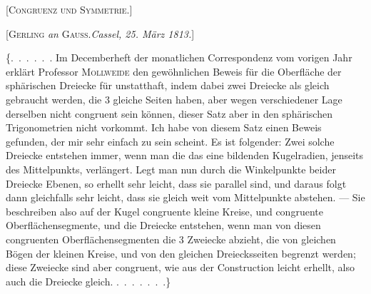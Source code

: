 \clearpage
{}%
\begin{center}
{\Large[\textsc{Congruenz und Symmetrie.}]}
\end{center}

\par\bigskip

\begin{center}
[\textsc{Gerling} \emph{an} \textsc{Gauss}.\quad \emph{Cassel, 25. März 1813.}]
\end{center}

\{\mbox{.\ .\ .\ .\ .\ .} Im Decemberheft der monatlichen Correspondenz vom vorigen Jahr
erklärt Professor \textsc{Mollweide} den gewöhnlichen Beweis für die
Oberfläche der sphärischen Dreiecke für unstatthaft, indem dabei zwei
Dreiecke als gleich gebraucht werden, die 3 gleiche Seiten haben, aber wegen
verschiedener Lage derselben nicht congruent sein können, dieser Satz aber
in den sphärischen Trigonometrien nicht vorkommt. Ich habe von diesem Satz
einen Beweis gefunden, der mir sehr einfach zu sein scheint. Es ist
folgender: Zwei solche Dreiecke entstehen immer, wenn man die das eine
bildenden Kugelradien, jenseits des Mittelpunkts, verlängert. Legt man nun
durch die Winkelpunkte beider Dreiecke Ebenen, so erhellt sehr leicht, dass
sie parallel sind, und daraus folgt dann gleichfalls sehr leicht, dass sie
gleich weit vom Mittelpunkte abstehen. --- Sie beschreiben also auf der
Kugel congruente kleine Kreise, und congruente Oberflächensegmente, und die
Dreiecke entstehen, wenn man von diesen congruenten Oberflächensegmenten die
3 Zweiecke abzieht, die von gleichen Bögen der kleinen Kreise, und von den
gleichen Dreiecksseiten begrenzt werden; diese Zweiecke sind aber congruent,
wie aus der Construction leicht erhellt, also auch die Dreiecke gleich.
\mbox{.\ .\ .\ .\ .\ .\ .}\}

\par\bigskip
